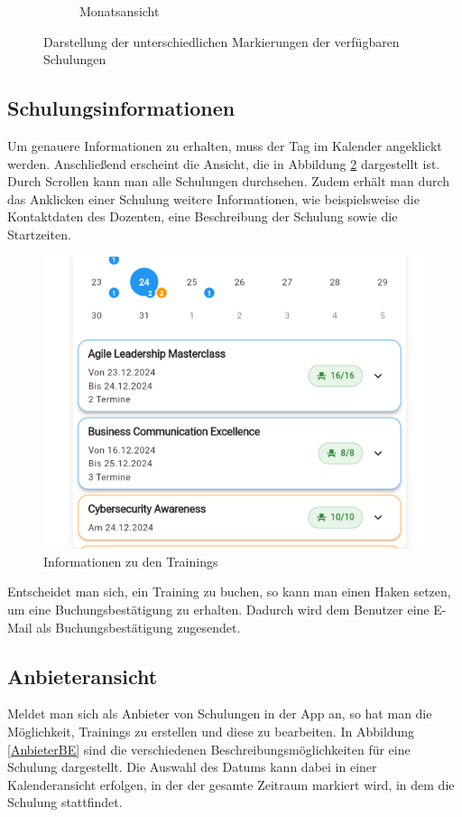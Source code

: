 \begin{figure}[htbp!]
\begin{subfigure}[b]{0.45\textwidth}
        \caption{Monatsansicht}
    \end{subfigure}
    \caption{Darstellung der unterschiedlichen Markierungen der verfügbaren Schulungen}
    \label{MarkierungSchulung}
\end{figure}


\subsection{Schulungsinformationen}
Um genauere Informationen zu erhalten, muss der Tag im Kalender angeklickt werden. Anschließend erscheint die Ansicht, die
in Abbildung \ref{InformationenBE} dargestellt ist. Durch Scrollen kann man alle Schulungen durchsehen. Zudem erhält man durch
das Anklicken einer Schulung weitere Informationen, wie beispielsweise die Kontaktdaten des Dozenten, eine Beschreibung der
Schulung sowie die Startzeiten.

\begin{figure}[htbp!]
    \centering
    \includegraphics[scale=0.7]{img/trainingsinformationen.png}
    \caption{Informationen zu den Trainings}
    \label{InformationenBE}
\end{figure}

Entscheidet man sich, ein Training zu buchen, so kann man einen Haken setzen, um eine Buchungsbestätigung zu erhalten. 
Dadurch wird dem Benutzer eine E-Mail als Buchungsbestätigung zugesendet.

\subsection{Anbieteransicht}
Meldet man sich als Anbieter von Schulungen in der App an, so hat man die Möglichkeit, Trainings zu erstellen und diese zu 
bearbeiten. In Abbildung \ref{AnbieterBE} sind die verschiedenen Beschreibungsmöglichkeiten für eine Schulung dargestellt.
Die Auswahl des Datums kann dabei in einer Kalenderansicht erfolgen, in der der gesamte Zeitraum markiert wird, in dem die
Schulung stattfindet.

